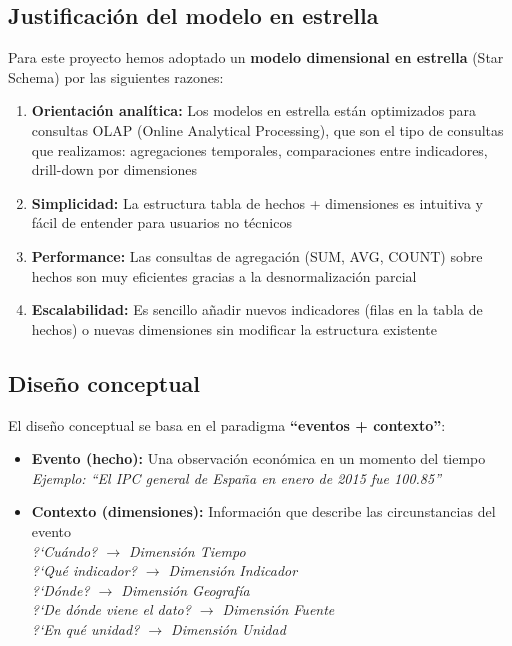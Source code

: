 \documentclass{article}
\begin{document}
\subsection{Justificaci\'on del modelo en estrella}

Para este proyecto hemos adoptado un \textbf{modelo dimensional en estrella} (Star Schema) por las siguientes razones:

\begin{enumerate}
    \item \textbf{Orientaci\'on anal\'itica:} Los modelos en estrella est\'an optimizados para consultas OLAP (Online Analytical Processing), que son el tipo de consultas que realizamos: agregaciones temporales, comparaciones entre indicadores, drill-down por dimensiones
    \item \textbf{Simplicidad:} La estructura tabla de hechos + dimensiones es intuitiva y f\'acil de entender para usuarios no t\'ecnicos
    \item \textbf{Performance:} Las consultas de agregaci\'on (SUM, AVG, COUNT) sobre hechos son muy eficientes gracias a la desnormalizaci\'on parcial
    \item \textbf{Escalabilidad:} Es sencillo a\~nadir nuevos indicadores (filas en la tabla de hechos) o nuevas dimensiones sin modificar la estructura existente
\end{enumerate}


\subsection{Dise\~no conceptual}

El dise\~no conceptual se basa en el paradigma \textbf{``eventos + contexto''}:

\begin{itemize}
    \item \textbf{Evento (hecho):} Una observaci\'on econ\'omica en un momento del tiempo\\
    \textit{Ejemplo: ``El IPC general de Espa\~na en enero de 2015 fue 100.85''}
    \item \textbf{Contexto (dimensiones):} Informaci\'on que describe las circunstancias del evento\\
    \textit{?`Cu\'ando? $\rightarrow$ Dimensi\'on Tiempo}\\
    \textit{?`Qu\'e indicador? $\rightarrow$ Dimensi\'on Indicador}\\
    \textit{?`D\'onde? $\rightarrow$ Dimensi\'on Geograf\'ia}\\
    \textit{?`De d\'onde viene el dato? $\rightarrow$ Dimensi\'on Fuente}\\
    \textit{?`En qu\'e unidad? $\rightarrow$ Dimensi\'on Unidad}
\end{itemize}
\end{document}
